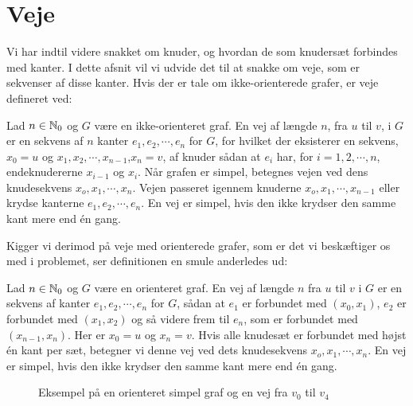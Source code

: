 	\section{Veje}
Vi har indtil videre snakket om knuder, og hvordan de som knudersæt forbindes med kanter. I dette afsnit vil vi udvide det til at snakke om veje, som er sekvenser af disse kanter. Hvis der er tale om ikke-orienterede grafer, er veje defineret ved:
\begin{defn}
[Veje] 
Lad $n \in \mathbb{N} _0$  og $G$ være en ikke-orienteret graf. En vej af længde $n$, fra $u$ til $v$, i $G$ er en sekvens af $n$ kanter $e_{1},e_{2},\cdots,e_{n}$ for $G$, for hvilket der eksisterer en sekvens, $x_{0}=u$ og $x_{1},x_{2},\cdots,x_{n-1}$,$x_{n}=v$, af knuder sådan at $e_{i}$ har, for $i=1,2,\cdots,n$, endeknudererne $x_{i-1}$ og $x_{i}$. Når grafen er simpel, betegnes vejen ved dens knudesekvens $x_{o},x_{1},\cdots,x_{n}$. Vejen passeret igennem knuderne $x_{o},x_{1},\cdots,x_{n-1}$ eller krydse kanterne $e_{1},e_{2},\cdots,e_{n}$. En vej er simpel, hvis den ikke krydser den samme kant mere end én gang.
\end{defn}
Kigger vi derimod på veje med orienterede grafer, som er det vi beskæftiger os med i problemet, ser definitionen en smule anderledes ud:
\begin{defn}
[Veje] 
Lad $n \in \mathbb{N} _0$ og $G$ være en orienteret graf. En vej af længde $n$ fra $u$ til $v$ i $G$ er en sekvens af kanter $e_{1},e_{2},\cdots,e_{n}$ for $G$, sådan at $e_{1}$ er forbundet med $(x_{0},x_{1})$, $e_{2}$ er forbundet med $(x_{1},x_{2})$ og så videre frem til $e_{n}$, som er forbundet med $(x_{n-1},x_{n})$. Her er $x_{0}=u$ og $x_{n}=v$. Hvis alle knudesæt er forbundet med højst én kant per sæt, betegner vi denne  vej ved dets knudesekvens $x_{o},x_{1},\cdots,x_{n}$. En vej er simpel, hvis den ikke krydser den samme kant mere end én gang.
\end{defn}

\begin{figure}[H]
\centering
	\caption{Eksempel på en orienteret simpel graf og en vej fra $v_{0}$ til $v_{4}$}
	\label{fig.vaegtetopg}
\end{figure}


